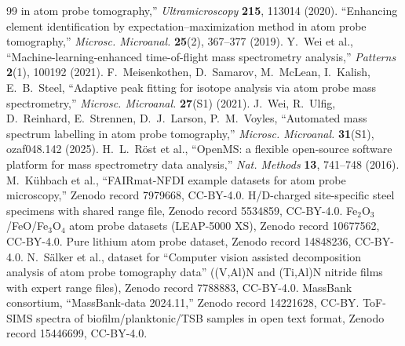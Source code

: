 \documentclass[11pt]{article}
\begin{document}
\begin{thebibliography}{99}
in atom probe tomography,'' \emph{Ultramicroscopy} \textbf{215}, 113014
(2020).
 ``Enhancing element
identification by expectation--maximization method in atom probe
tomography,'' \emph{Microsc. Microanal.} \textbf{25}(2), 367--377 (2019).
 Y.~Wei et al.,
``Machine-learning-enhanced time-of-flight mass spectrometry analysis,''
\emph{Patterns} \textbf{2}(1), 100192 (2021).
 F.~Meisenkothen,
D.~Samarov, M.~McLean, I.~Kalish, E.~B.~Steel, ``Adaptive peak fitting
for isotope analysis via atom probe mass spectrometry,'' \emph{Microsc.
Microanal.} \textbf{27}(S1) (2021).
 J.~Wei, R.~Ulfig,
D.~Reinhard, E.~Strennen, D.~J.~Larson, P.~M.~Voyles, ``Automated mass
spectrum labelling in atom probe tomography,'' \emph{Microsc. Microanal.}
\textbf{31}(S1), ozaf048.142 (2025).
 H.~L.~Röst et al., ``OpenMS:
a flexible open-source software platform for mass spectrometry data
analysis,'' \emph{Nat. Methods} \textbf{13}, 741--748 (2016).
 M.~Kühbach et al., ``FAIRmat-NFDI
example datasets for atom probe microscopy,'' Zenodo record 7979668,
CC-BY-4.0.
 H/D-charged site-specific
steel specimens with shared range file, Zenodo record 5534859, CC-BY-4.0.
 Fe$_2$O$_3$/FeO/Fe$_3$O$_4$
atom probe datasets (LEAP-5000 XS), Zenodo record 10677562, CC-BY-4.0.
 Pure lithium atom probe
dataset, Zenodo record 14848236, CC-BY-4.0.
 N.~S\"alker et al., dataset
for ``Computer vision assisted decomposition analysis of atom probe
tomography data'' ((V,Al)N and (Ti,Al)N nitride films with expert range
files), Zenodo record 7788883, CC-BY-4.0.
 MassBank consortium,
``MassBank-data 2024.11,'' Zenodo record 14221628, CC-BY.
 ToF-SIMS spectra of
biofilm/planktonic/TSB samples in open text format, Zenodo record
15446699, CC-BY-4.0.
\end{thebibliography}
\end{document}
